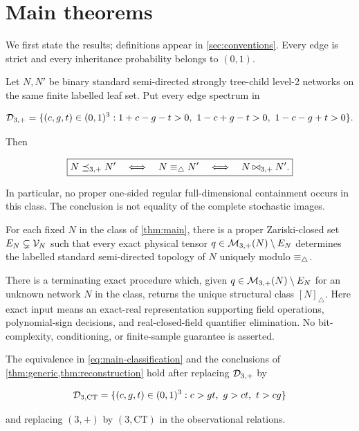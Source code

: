 \section{Main theorems}\label{sec:main-theorems}

We first state the results; definitions appear in \cref{sec:conventions}.
Every edge is strict and every inheritance probability belongs to \((0,1)\).

\begin{theorem}\label{thm:main}
Let \(N,N'\) be binary standard semi-directed strongly tree-child level-2
networks on the same finite labelled leaf set.  Put every edge spectrum in

\[
 \mathcal D_{3,+}=\{(c,g,t)\in(0,1)^3:
 1+c-g-t>0,\ 1-c+g-t>0,\ 1-c-g+t>0\}.
\]

Then

\begin{equation}\label{eq:main-classification}
 \boxed{
 N\preceq_{3,+} N'
 \quad\Longleftrightarrow\quad
 N\equiv_\triangle N'
 \quad\Longleftrightarrow\quad
 N\mathbin{\bowtie}_{3,+} N'.}
\end{equation}

In particular, no proper one-sided regular full-dimensional containment
occurs in this class.  The conclusion is not equality of the complete
stochastic images.
\end{theorem}

\begin{theorem}\label{thm:generic}
For each fixed \(N\) in the class of \cref{thm:main}, there is a proper
Zariski-closed set \(E_N\subsetneq\mathcal V_N\) such that every exact physical tensor
\(q\in\mathcal M_{3,+}(N)\setminus E_N\) determines the labelled standard
semi-directed topology of \(N\) uniquely modulo \(\equiv_\triangle\).
\end{theorem}

\begin{theorem}\label{thm:reconstruction}
There is a terminating exact procedure which, given
\(q\in\mathcal M_{3,+}(N)\setminus E_N\) for an unknown network \(N\) in the class,
returns the unique structural class \([N]_\triangle\).  Here exact input means
an exact-real representation supporting field operations, polynomial-sign
decisions, and real-closed-field quantifier elimination.  No bit-complexity,
conditioning, or finite-sample guarantee is asserted.
\end{theorem}

\begin{corollary}\label{cor:ct-main}
The equivalence in \eqref{eq:main-classification} and the conclusions of
\cref{thm:generic,thm:reconstruction} hold after replacing \(\mathcal D_{3,+}\) by

\[
 \Dct=\{(c,g,t)\in(0,1)^3:c>gt,\ g>ct,\ t>cg\}
\]

and replacing \((3,+)\) by \((3,\mathrm{CT})\) in the observational relations.
\end{corollary}

